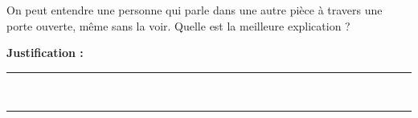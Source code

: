 On peut entendre une personne qui parle dans une autre pièce à travers une porte ouverte, même sans la voir. Quelle est la meilleure explication ?

\choices

\noindent\textbf{Justification :} \hrulefill \\[2.5ex]
\rule{\linewidth}{0.4pt} \\[2.5ex]
\rule{\linewidth}{0.4pt}
\vfill
